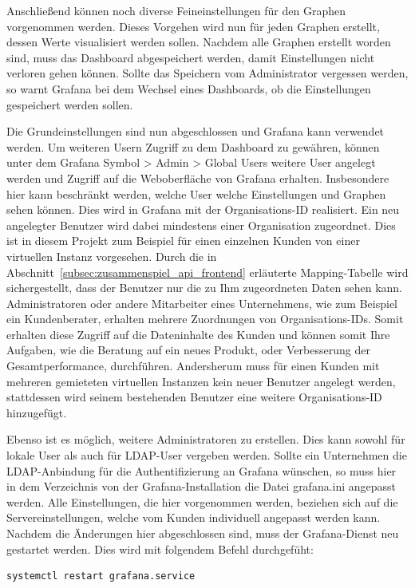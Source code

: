 Anschließend können noch diverse Feineinstellungen für den Graphen vorgenommen
werden. Dieses Vorgehen wird nun für jeden Graphen erstellt, dessen Werte
visualisiert werden sollen. Nachdem alle Graphen erstellt worden sind, muss das
Dashboard abgespeichert werden, damit Einstellungen nicht verloren gehen
können. Sollte das Speichern vom Administrator vergessen werden, so warnt
Grafana bei dem Wechsel eines Dashboards, ob die Einstellungen gespeichert
werden sollen.

Die Grundeinstellungen sind nun abgeschlossen und Grafana kann verwendet
werden. Um weiteren Usern Zugriff zu dem Dashboard zu gewähren, können unter
dem Grafana Symbol > Admin > Global Users weitere User angelegt werden und
Zugriff auf die Weboberfläche von Grafana erhalten. Insbesondere hier kann
beschränkt werden, welche User welche Einstellungen und Graphen sehen können.
Dies wird in Grafana mit der Organisations-ID realisiert. Ein neu angelegter
Benutzer wird dabei mindestens einer Organisation zugeordnet. Dies ist in
diesem Projekt zum Beispiel für einen einzelnen Kunden von einer virtuellen
Instanz vorgesehen. Durch die in
Abschnitt~\ref{subsec:zusammenspiel_api_frontend} erläuterte Mapping-Tabelle
wird sichergestellt, dass der Benutzer nur die zu Ihm zugeordneten Daten sehen
kann. Administratoren oder andere Mitarbeiter eines Unternehmens, wie zum
Beispiel ein Kundenberater, erhalten mehrere Zuordnungen von Organisations-IDs.
Somit erhalten diese Zugriff auf die Dateninhalte des Kunden und können somit
Ihre Aufgaben, wie die Beratung auf ein neues Produkt, oder Verbesserung der
Gesamtperformance, durchführen. Andersherum muss für einen Kunden mit mehreren
gemieteten virtuellen Instanzen kein neuer Benutzer angelegt werden,
stattdessen wird seinem bestehenden Benutzer eine weitere Organisations-ID
hinzugefügt.

Ebenso ist es möglich, weitere Administratoren zu erstellen. Dies kann sowohl
für lokale User als auch für LDAP\hyp{}User vergeben werden.  Sollte ein
Unternehmen die LDAP\hyp{}Anbindung für die Authentifizierung an Grafana
wünschen, so muss hier in dem Verzeichnis von der Grafana\hyp{}Installation die
Datei grafana.ini angepasst werden. Alle Einstellungen, die hier vorgenommen
werden, beziehen sich auf die Servereinstellungen, welche vom Kunden
individuell angepasst werden kann.  Nachdem die Änderungen hier abgeschlossen
sind, muss der Grafana\hyp{}Dienst neu gestartet werden. Dies wird mit
folgendem Befehl durchgefüht:

\begin{verbatim}
systemctl restart grafana.service
\end{verbatim}

